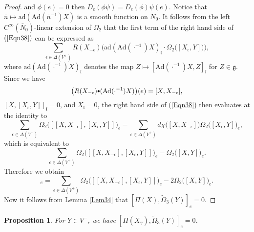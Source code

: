 \documentclass[11pt]{amsart}
\newtheorem{Prop}[equation]{Proposition}
\numberwithin{equation}{section}
\begin{document}
\begin{proof}
and $\phi(e) =0$ then $D_e(\phi\psi) = D_e(\phi)\psi(e)$.
Notice that ${\bar{n}} \mapsto {\text{ad}}({\text{Ad}}({\bar{n}}^{-1})X)$ is a smooth function on ${\bar{N}}_0$.
It follows from the left $C^\infty(\bar N_0)$-linear extension of $\Omega_2$
that the first term of the right hand side of $(\ref{Eqn38})$ can be expressed as
\begin{equation*}
\sum_{{\epsilon} \in {\Delta}(V^+)}
R(X_{-{\epsilon}}) \big( {\text{ad}}({\text{Ad}}(\cdot^{-1})X)_{{\mathfrak l}} \cdot \Omega_2\big([X_{\epsilon}, Y]\big) \big),
\end{equation*} 
where ${\text{ad}}({\text{Ad}}(\cdot^{-1})X)_{{\mathfrak l}}$ denotes the map $Z \mapsto [{\text{Ad}}(\cdot^{-1})X, Z]_{{\mathfrak l}}$
for $Z \in {{\mathfrak g}}$.
Since we have
\begin{equation*} 
\big(R(X_{-{\epsilon}}){ {\raisebox{1pt} {$\scriptstyle \bullet$} } } ({\text{Ad}}(\cdot^{-1})X)\big)(e)  = [X,X_{-{\epsilon}}],
\end{equation*}
\vskip 0.05in
\noindent
$[X, [X_{\epsilon}, Y]]_{{\mathfrak l}} = 0$, and
$X_{{\mathfrak l}} = 0$,  
the right hand side of (\ref{Eqn38}) then evaluates at the identity to
\begin{equation*}
\sum_{{\epsilon}\in{\Delta}(V^+)}\Omega_2\big([[X, X_{-{\epsilon}}],[X_{\epsilon}, Y]]\big)_e
-\sum_{{\epsilon}\in{\Delta}(V^+)} d\chi\big( [X, X_{-{\epsilon}}]\big) \Omega_2\big([X_{\epsilon}, Y]\big)_e,
\end{equation*}
which is equivalent to
\begin{equation*}
\sum_{{\epsilon}\in{\Delta}(V^+)}\Omega_2\big([[X, X_{-{\epsilon}}],[X_{\epsilon}, Y]]\big)_e
-\Omega_2\big([X,Y]\big)_e.
\end{equation*}
Therefore we obtain
\begin{equation*}
[\Pi(X), \tilde{\Omega}_3(Y)]_e
= \sum_{{\epsilon}\in{\Delta}(V^+)}\Omega_2\big([[X, X_{-{\epsilon}}],[X_{\epsilon}, Y]]\big)_e
-2\Omega_2\big([X,Y]\big)_e.
\end{equation*}
Now it follows from Lemma \ref{Lem34} that 
$[\Pi(X), \tilde{\Omega}_3(Y)]_e = 0$.
\end{proof}

\begin{Prop}\label{Prop37}
For $Y \in V^-$, we have $[\Pi(X_\gamma), \tilde{\Omega}_3(Y)]_e = 0$.
\end{Prop}
\end{document}
